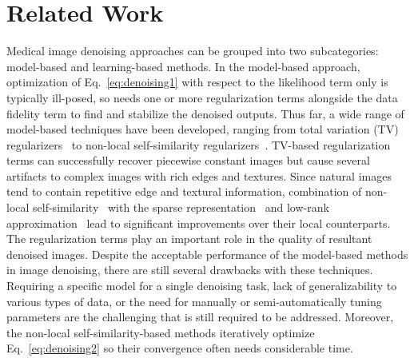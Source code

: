 \documentclass[journal,twoside,web]{ieeecolor}
\begin{document}
\section{Related Work}
Medical image denoising approaches can be grouped into two subcategories: model-based and learning-based methods. 
In the model-based approach, optimization of Eq.~\ref{eq:denoising1} with respect to the likelihood term only is typically ill-posed, so needs one or more regularization terms alongside the data fidelity term to find and stabilize the denoised outputs. 
Thus far, a wide range of model-based techniques have been developed, ranging from total variation (TV) regularizers~\cite{getreuer2012rudin,zhang2016statistical,sidky2008image} to non-local self-similarity regularizers~\cite{mairal2009non,dabov2007image,maggioni2012nonlocal,kong2017new,gal2009denoising,manjon2010adaptive,chen2019denoising}. 
TV-based regularization terms can successfully recover piecewise constant images but cause several artifacts to complex images with rich edges and textures. 
Since natural images tend to contain repetitive edge and textural information, combination of non-local self-similarity~\cite{mairal2009non,dabov2007image,maggioni2012nonlocal,kong2017new} with the sparse representation~\cite{papyan2017convolutional} and low-rank approximation~\cite{cai2014cine} lead to significant improvements over their local counterparts. 
The regularization terms play an important role in the quality of resultant denoised images. Despite the acceptable performance of the model-based methods in image denoising, there are still several drawbacks with these techniques. Requiring a specific model for a single denoising task, lack of generalizability to various types of data, or the need for manually or semi-automatically tuning parameters are the challenging that is still required to be addressed. Moreover, the non-local self-similarity-based methods iteratively optimize Eq.~\ref{eq:denoising2} so their convergence often needs considerable time.
\end{document}
